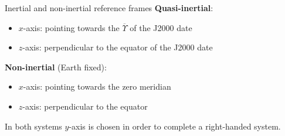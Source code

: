 \documentclass{beamer} %
\begin{document}
\begin{frame}{Inertial and non-inertial reference frames}
  \textbf{Quasi-inertial}:
  \begin{itemize}
    \item $x$-axis: pointing towards the $\overline{\Upsilon}$ of the J2000 date
    \item $z$-axis: perpendicular to the equator of the J2000 date
  \end{itemize}

  \textbf{Non-inertial} (Earth fixed):
  \begin{itemize}
    \item $x$-axis: pointing towards the zero meridian
    \item $z$-axis: perpendicular to the equator
  \end{itemize}

  In both systems $y$-axis is chosen in order to complete a right-handed system.
\end{frame}
\end{document}
